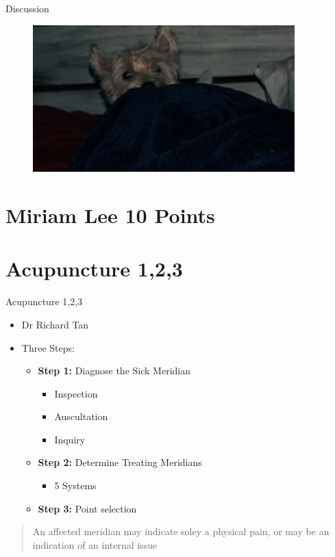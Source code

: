 \documentclass{beamer}
\begin{document}
\begin{frame}{Discussion}
  \begin{figure}
    \centering
    \includegraphics[width=0.9\textwidth]{img/westie02.jpg}
  \end{figure}
\end{frame}

\section{Miriam Lee 10 Points}

\section{Acupuncture 1,2,3}

\begin{frame}{Acupuncture 1,2,3}
  \begin{itemize}
  \item Dr Richard Tan
  \item Three Steps:
    \begin{itemize} \itemsep1em
    \item \textbf{Step 1:} Diagnose the Sick Meridian
      \begin{itemize}
      \item Inspection
      \item Auscultation
      \item Inquiry
      \end{itemize}
    \item \textbf{Step 2:} Determine Treating Meridians
      \begin{itemize}
      \item{5 Systems}
      \end{itemize}
    \item \textbf{Step 3:} Point selection
    \end{itemize}
  \end{itemize}

  \begin{quote}
    An affected meridian may indicate soley a physical pain, or may be an indication of an internal issue
  \end{quote}
\end{frame}
\end{document}
